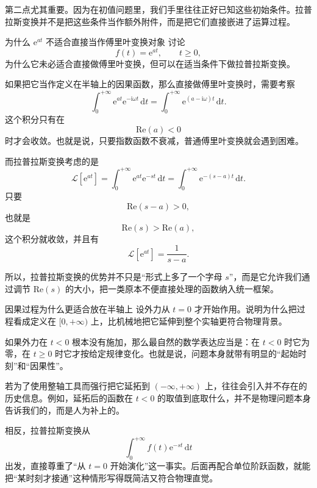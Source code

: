 第二点尤其重要。因为在初值问题里，我们手里往往正好已知这些初始条件。拉普拉斯变换并不是把这些条件当作额外附件，而是把它们直接嵌进了运算过程。

\begin{lizi}{为什么 $\mathrm{e}^{at}$ 不适合直接当作傅里叶变换对象}{}
讨论
\[
    f(t)=\mathrm{e}^{at}, \qquad t\ge 0,
\]
为什么它未必适合直接做傅里叶变换，但可以在适当条件下做拉普拉斯变换。

\begin{jie}
如果把它当作定义在半轴上的因果函数，那么直接做傅里叶变换时，需要考察
\[
    \int_0^{+\infty} \mathrm{e}^{at}\mathrm{e}^{-\mathrm{i}\omega t}\,\mathrm{d}t
    =
    \int_0^{+\infty} \mathrm{e}^{(a-\mathrm{i}\omega)t}\,\mathrm{d}t.
\]
这个积分只有在
\[
    \mathrm{Re}(a)<0
\]
时才会收敛。也就是说，只要指数函数不衰减，普通傅里叶变换就会遇到困难。

而拉普拉斯变换考虑的是
\[
    \mathcal{L}[\mathrm{e}^{at}]
    =
    \int_0^{+\infty} \mathrm{e}^{at}\mathrm{e}^{-st}\,\mathrm{d}t
    =
    \int_0^{+\infty} \mathrm{e}^{-(s-a)t}\,\mathrm{d}t.
\]
只要
\[
    \mathrm{Re}(s-a)>0,
\]
也就是
\[
    \mathrm{Re}(s)>\mathrm{Re}(a),
\]
这个积分就收敛，并且有
\[
    \mathcal{L}[\mathrm{e}^{at}]
    =
    \frac{1}{s-a}.
\]

所以，拉普拉斯变换的优势并不只是``形式上多了一个字母 $s$''，而是它允许我们通过调节 $\mathrm{Re}(s)$ 的大小，把一类原本不便直接处理的函数纳入统一框架。
\end{jie}
\end{lizi}

\begin{lizi}{因果过程为什么更适合放在半轴上}{}
设外力从 $t=0$ 才开始作用。说明为什么把过程看成定义在 $[0,+\infty)$ 上，比机械地把它延伸到整个实轴更符合物理背景。

\begin{jie}
如果外力在 $t<0$ 根本没有施加，那么最自然的数学表达应当是：在 $t<0$ 时它为零，在 $t\ge 0$ 时它才按给定规律变化。也就是说，问题本身就带有明显的``起始时刻''和``因果性''。

若为了使用整轴工具而强行把它延拓到 $(-\infty,+\infty)$ 上，往往会引入并不存在的历史信息。例如，延拓后的函数在 $t<0$ 的取值到底取什么，并不是物理问题本身告诉我们的，而是人为补上的。

相反，拉普拉斯变换从
\[
    \int_0^{+\infty} f(t)\mathrm{e}^{-st}\,\mathrm{d}t
\]
出发，直接尊重了``从 $t=0$ 开始演化''这一事实。后面再配合单位阶跃函数，就能把``某时刻才接通''这种情形写得既简洁又符合物理直觉。
\end{jie}
\end{lizi}

